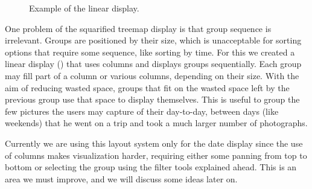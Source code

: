 \begin{figure}[!htb]
  \begin{subfigmatrix}{2}
  \end{subfigmatrix}
  \caption{Example of the linear display.}
  \label{fig:linear}
\end{figure}

One problem of the squarified treemap display is that group sequence is irrelevant. Groups are positioned by their size, which is unacceptable for sorting options that require some sequence, like sorting by time. For this we created a linear display () that uses columns and displays groups sequentially. Each group may fill part of a column or various columns, depending on their size. With the aim of reducing wasted space, groups that fit on the wasted space left by the previous group use that space to display themselves. This is useful to group the few pictures the users may capture of their day-to-day, between days (like weekends) that he went on a trip and took a much larger number of photographs.

Currently we are using this layout system only for the date display since the use of columns makes visualization harder, requiring either some panning from top to bottom or selecting the group using the filter tools explained ahead. This is an area we must improve, and we will discuss some ideas later on.


